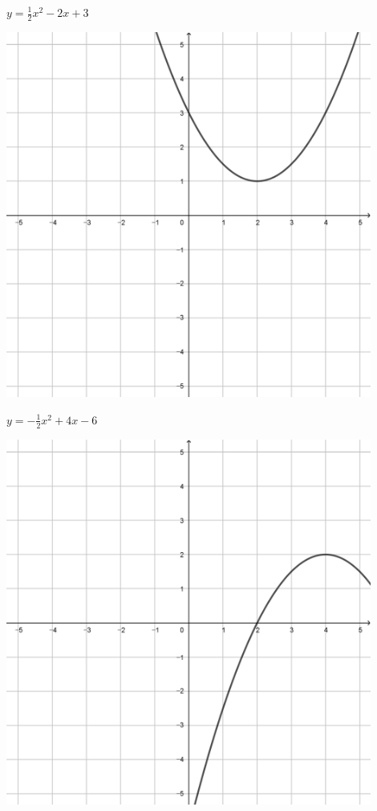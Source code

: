 \documentclass[a4paper]{oblivoir}
\begin{document}
\begin{minipage}{0.45\textwidth}\centering
\(y=\frac12x^2-2x+3\)
\par\bigskip\includegraphics[width=0.9\textwidth]{img/2_quadratic_37}
\end{minipage}
\begin{minipage}{0.45\textwidth}\centering
\(y=-\frac12x^2+4x-6\)
\par\bigskip\includegraphics[width=0.9\textwidth]{img/2_quadratic_38}
\end{minipage}\bigskip\bigskip\par
\end{document}
